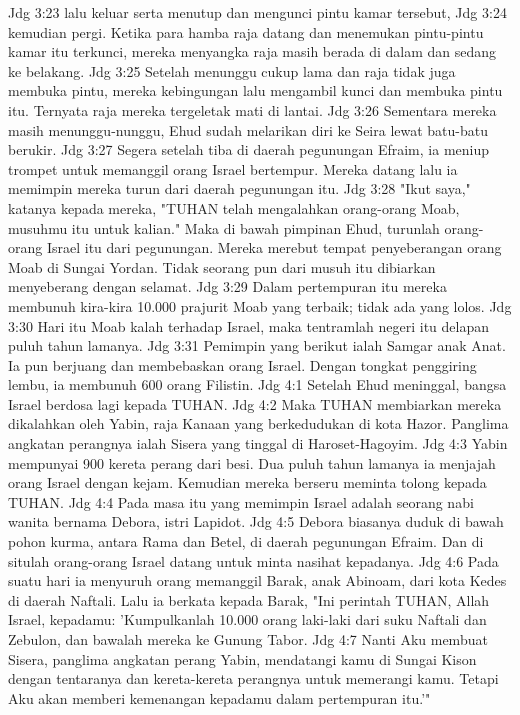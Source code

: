Jdg 3:23  lalu keluar serta menutup dan mengunci pintu kamar tersebut,
Jdg 3:24  kemudian pergi. Ketika para hamba raja datang dan menemukan pintu-pintu kamar itu terkunci, mereka menyangka raja masih berada di dalam dan sedang ke belakang.
Jdg 3:25  Setelah menunggu cukup lama dan raja tidak juga membuka pintu, mereka kebingungan lalu mengambil kunci dan membuka pintu itu. Ternyata raja mereka tergeletak mati di lantai.
Jdg 3:26  Sementara mereka masih menunggu-nunggu, Ehud sudah melarikan diri ke Seira lewat batu-batu berukir.
Jdg 3:27  Segera setelah tiba di daerah pegunungan Efraim, ia meniup trompet untuk memanggil orang Israel bertempur. Mereka datang lalu ia memimpin mereka turun dari daerah pegunungan itu.
Jdg 3:28  "Ikut saya," katanya kepada mereka, "TUHAN telah mengalahkan orang-orang Moab, musuhmu itu untuk kalian." Maka di bawah pimpinan Ehud, turunlah orang-orang Israel itu dari pegunungan. Mereka merebut tempat penyeberangan orang Moab di Sungai Yordan. Tidak seorang pun dari musuh itu dibiarkan menyeberang dengan selamat.
Jdg 3:29  Dalam pertempuran itu mereka membunuh kira-kira 10.000 prajurit Moab yang terbaik; tidak ada yang lolos.
Jdg 3:30  Hari itu Moab kalah terhadap Israel, maka tentramlah negeri itu delapan puluh tahun lamanya.
Jdg 3:31  Pemimpin yang berikut ialah Samgar anak Anat. Ia pun berjuang dan membebaskan orang Israel. Dengan tongkat penggiring lembu, ia membunuh 600 orang Filistin.
Jdg 4:1  Setelah Ehud meninggal, bangsa Israel berdosa lagi kepada TUHAN.
Jdg 4:2  Maka TUHAN membiarkan mereka dikalahkan oleh Yabin, raja Kanaan yang berkedudukan di kota Hazor. Panglima angkatan perangnya ialah Sisera yang tinggal di Haroset-Hagoyim.
Jdg 4:3  Yabin mempunyai 900 kereta perang dari besi. Dua puluh tahun lamanya ia menjajah orang Israel dengan kejam. Kemudian mereka berseru meminta tolong kepada TUHAN.
Jdg 4:4  Pada masa itu yang memimpin Israel adalah seorang nabi wanita bernama Debora, istri Lapidot.
Jdg 4:5  Debora biasanya duduk di bawah pohon kurma, antara Rama dan Betel, di daerah pegunungan Efraim. Dan di situlah orang-orang Israel datang untuk minta nasihat kepadanya.
Jdg 4:6  Pada suatu hari ia menyuruh orang memanggil Barak, anak Abinoam, dari kota Kedes di daerah Naftali. Lalu ia berkata kepada Barak, "Ini perintah TUHAN, Allah Israel, kepadamu: 'Kumpulkanlah 10.000 orang laki-laki dari suku Naftali dan Zebulon, dan bawalah mereka ke Gunung Tabor.
Jdg 4:7  Nanti Aku membuat Sisera, panglima angkatan perang Yabin, mendatangi kamu di Sungai Kison dengan tentaranya dan kereta-kereta perangnya untuk memerangi kamu. Tetapi Aku akan memberi kemenangan kepadamu dalam pertempuran itu.'"
